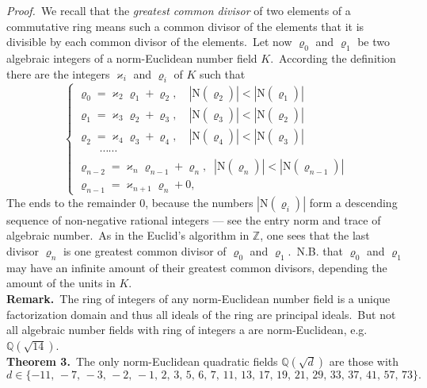 \documentclass[12pt]{article}
\theoremstyle{definition}
\begin{document}
{\em Proof.}\, We recall that the {\em greatest common divisor} of two elements of a commutative ring means such a common divisor of the elements that it is divisible by each common divisor of the elements.\, Let now $\varrho_0$ and $\varrho_1$ be two algebraic integers of a norm-Euclidean number field $K$.\, According the definition there are the integers $\varkappa_i$ and $\varrho_i$ of $K$ such that
$$
\begin{cases}
\varrho_0 = \varkappa_2\varrho_1+\varrho_2, \quad
  |\mbox{N}(\varrho_2)| < |\mbox{N}(\varrho_1)|\\
\varrho_1 = \varkappa_3\varrho_2+\varrho_3, \quad
  |\mbox{N}(\varrho_3)| < |\mbox{N}(\varrho_2)|\\
\varrho_2 = \varkappa_4\varrho_3+\varrho_4, \quad
  |\mbox{N}(\varrho_4)| < |\mbox{N}(\varrho_3)|\\
\qquad\cdots\cdots\\
\varrho_{n-2} = \varkappa_n\varrho_{n-1}+\varrho_n,\;\;
  |\mbox{N}(\varrho_n)| < |\mbox{N}(\varrho_{n-1})|\\
\varrho_{n-1} = \varkappa_{n+1}\varrho_n+0,
\end{cases}
$$
The  ends to the remainder 0, because the numbers $|\mbox{N}(\varrho_i)|$ form a descending sequence of non-negative rational integers --- see the entry norm and trace of algebraic number.\, As in the Euclid's algorithm in $\mathbb{Z}$, one sees that the last divisor $\varrho_n$ is one greatest common divisor of $\varrho_0$ and $\varrho_1$.\, N.B. that $\varrho_0$ and $\varrho_1$ may have an infinite amount of their greatest common divisors, depending the amount of the units in $K$.\\

\textbf{Remark.}\, The ring of integers of any norm-Euclidean number field is a unique factorization domain and thus all ideals of the ring are principal ideals.\, But not all algebraic number fields with ring of integers a  are norm-Euclidean, e.g. $\mathbb{Q}(\sqrt{14})$.\\

\textbf{Theorem 3.}\, The only norm-Euclidean quadratic fields $\mathbb{Q}(\sqrt{d})$ are those with 
$$d\in\{-11,\,-7,\,-3,\,-2,\,-1,\,2,\,3,\,5,\,6,\,7,\,11,\,13,\,17,\,19,\,21,\,29,\,33,\,37,\,41,\,57,\,73\}.$$
\end{document}
